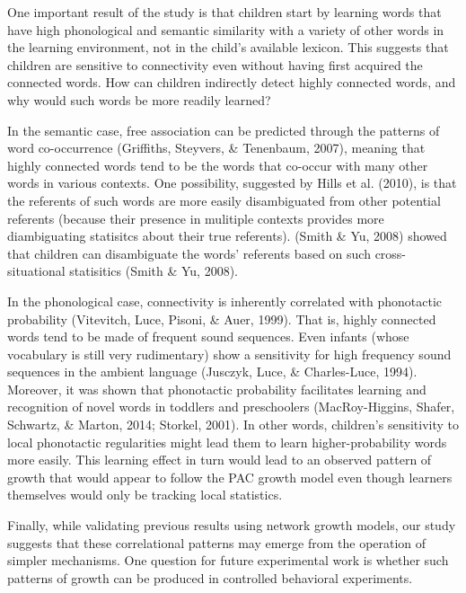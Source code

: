 \documentclass[10pt, letterpaper]{article}
\begin{document}
One important result of the study is that children start by learning
words that have high phonological and semantic similarity with a variety
of other words in the learning environment, not in the child's available
lexicon. This suggests that children are sensitive to connectivity even
without having first acquired the connected words. How can children
indirectly detect highly connected words, and why would such words be
more readily learned?

In the semantic case, free association can be predicted through the
patterns of word co-occurrence (Griffiths, Steyvers, \& Tenenbaum,
2007), meaning that highly connected words tend to be the words that
co-occur with many other words in various contexts. One possibility,
suggested by Hills et al. (2010), is that the referents of such words
are more easily disambiguated from other potential referents (because
their presence in mulitiple contexts provides more diambiguating
statisitcs about their true referents). (Smith \& Yu, 2008) showed that
children can disambiguate the words' referents based on such
cross-situational statisitics (Smith \& Yu, 2008).

In the phonological case, connectivity is inherently correlated with
phonotactic probability (Vitevitch, Luce, Pisoni, \& Auer, 1999). That
is, highly connected words tend to be made of frequent sound sequences.
Even infants (whose vocabulary is still very rudimentary) show a
sensitivity for high frequency sound sequences in the ambient language
(Jusczyk, Luce, \& Charles-Luce, 1994). Moreover, it was shown that
phonotactic probability facilitates learning and recognition of novel
words in toddlers and preschoolers (MacRoy-Higgins, Shafer, Schwartz, \&
Marton, 2014; Storkel, 2001). In other words, children's sensitivity to
local phonotactic regularities might lead them to learn
higher-probability words more easily. This learning effect in turn would
lead to an observed pattern of growth that would appear to follow the
PAC growth model even though learners themselves would only be tracking
local statistics.

Finally, while validating previous results using network growth models,
our study suggests that these correlational patterns may emerge from the
operation of simpler mechanisms. One question for future experimental
work is whether such patterns of growth can be produced in controlled
behavioral experiments.

\vspace{1em}

\vspace{1em}
\end{document}
